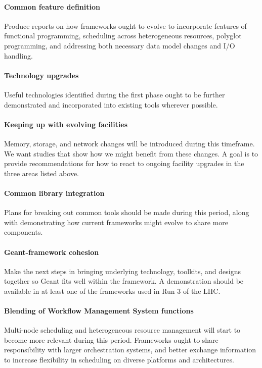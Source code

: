 \documentclass[12pt,a4paper]{article}
\begin{document}
\paragraph{Common feature definition} Produce reports on how
frameworks ought to evolve to incorporate features of functional
programming, scheduling across heterogeneous resources, polyglot
programming, and addressing both necessary data model changes and I/O
handling.

\paragraph{Technology upgrades} Useful technologies identified during
the first phase ought to be further demonstrated and incorporated into
existing tools wherever possible.

\paragraph{Keeping up with evolving facilities} Memory, storage, and
network changes will be introduced during this timeframe. We want
studies that show how we might benefit from these changes. A goal is
to provide recommendations for how to react to ongoing facility
upgrades in the three areas listed above.

\paragraph{Common library integration} Plans for breaking out common
tools should be made during this period, along with demonstrating how
current frameworks might evolve to share more components.

\paragraph{Geant-framework cohesion} Make the next steps in bringing
underlying technology, toolkits, and designs together so Geant fits
well within the framework. A demonstration should be available in at
least one of the frameworks used in Run 3 of the LHC.

\paragraph{Blending of Workflow Management System functions}
Multi-node scheduling and heterogeneous resource management will start
to become more relevant during this period. Frameworks ought to share
responsibility with larger orchestration systems, and better exchange
information to increase flexibility in scheduling on diverse platforms
and architectures.
\end{document}
